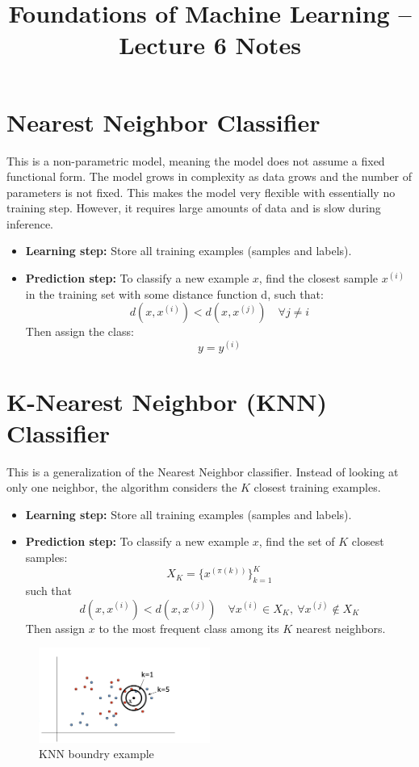 \documentclass[11pt]{article}
\title{Foundations of Machine Learning -- Lecture 6 Notes}
\author{}
\date{}
\begin{document}
\maketitle

\section*{Nearest Neighbor Classifier}
This is a non-parametric model, meaning the model does not assume a fixed functional form.
The model grows in complexity as data grows and the number of parameters is not fixed.
This makes the model very flexible with essentially no training step.
However, it requires large amounts of data and is slow during inference.

\begin{itemize}
	\item \textbf{Learning step:} Store all training examples (samples and labels).
	\item \textbf{Prediction step:} To classify a new example $x$, find the closest sample $x^{(i)}$ in the training set with some distance function d, such that:
	      \[
		      d(x, x^{(i)}) < d(x, x^{(j)}) \quad \forall j \neq i
	      \]
	      Then assign the class:
	      \[
		      y = y^{(i)}
	      \]
\end{itemize}

\section*{K-Nearest Neighbor (KNN) Classifier}
This is a generalization of the Nearest Neighbor classifier.
Instead of looking at only one neighbor, the algorithm considers the $K$ closest training examples.

\begin{itemize}
	\item \textbf{Learning step:} Store all training examples (samples and labels).
	\item \textbf{Prediction step:} To classify a new example $x$, find the set of $K$ closest samples:
	      \[
		      X_K = \{ x^{(\pi(k))} \}_{k=1}^K
	      \]
	      such that
	      \[
		      d(x, x^{(i)}) < d(x, x^{(j)}) \quad \forall x^{(i)} \in X_K, \ \forall x^{(j)} \notin X_K
	      \]
	      Then assign $x$ to the most frequent class among its $K$ nearest neighbors.
\end{itemize}

\begin{figure}[ht!]
	\centering
	\includegraphics[width=0.5\textwidth]{../imgs/knn.png} %
	\caption{KNN boundry example}
\end{figure}
\end{document}

